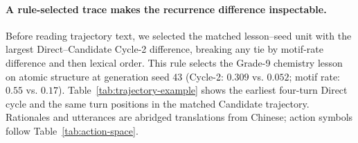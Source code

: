 \documentclass[manuscript,review,anonymous]{acmart}
\begin{document}
\paragraph{A rule-selected trace makes the recurrence difference inspectable.}
Before reading trajectory text, we selected the matched lesson--seed unit with
the largest Direct--Candidate Cycle-2 difference, breaking any tie by motif-rate
difference and then lexical order. This rule selects the Grade-9 chemistry
lesson on atomic structure at generation seed 43 (Cycle-2: $0.309$ vs.
$0.052$; motif rate: $0.55$ vs. $0.17$). Table~\ref{tab:trajectory-example}
shows the earliest four-turn Direct cycle and the same turn positions in the
matched Candidate trajectory. Rationales and utterances are abridged
translations from Chinese; action symbols follow Table~\ref{tab:action-space}.
\end{document}
